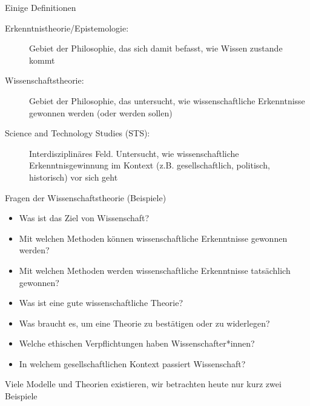 \documentclass{beamer}
\begin{document}
\begin{frame}{Einige Definitionen}

\begin{description} 
    \item[Erkenntnistheorie/Epistemologie:] Gebiet der Philosophie, das sich damit befasst, wie Wissen zustande kommt
    \item[Wissenschaftstheorie:] Gebiet der Philosophie, das untersucht, wie wissenschaftliche Erkenntnisse gewonnen werden (oder werden sollen)
    \item[Science and Technology Studies (STS):] Interdisziplinäres Feld. Untersucht, wie wissenschaftliche Erkenntnisgewinnung im Kontext (z.B. gesellschaftlich, politisch, historisch) vor sich geht


\end{description}
    
\end{frame}

\begin{frame}{Fragen der Wissenschaftstheorie (Beispiele)}

\begin{itemize}
    \item Was ist das Ziel von Wissenschaft?
    \item Mit welchen Methoden können wissenschaftliche Erkenntnisse gewonnen werden?
    \item Mit welchen Methoden werden wissenschaftliche Erkenntnisse tatsächlich gewonnen?
    \item Was ist eine gute wissenschaftliche Theorie?
    \item Was braucht es, um eine Theorie zu bestätigen oder zu widerlegen?
    \item Welche ethischen Verpflichtungen haben Wissenschafter*innen?
    \item 
    In welchem gesellschaftlichen Kontext passiert Wissenschaft?
\end{itemize}

Viele Modelle und Theorien existieren, wir betrachten heute nur kurz zwei Beispiele

\end{frame}
\end{document}
